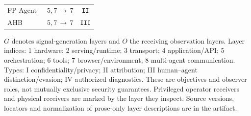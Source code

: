 \begin{table}[!t]
\begin{minipage}[t]{0.49\textwidth}
\begin{tabularx}{\linewidth}{@{}Ycc@{}}
FP-Agent~\cite{wang2026fpagent} & $5,7\,\to\,7$ & \texttt{II}\\
AHB~\cite{zhu2026turing} & $5,7\,\to\,7$ & \texttt{III}\\
\bottomrule\end{tabularx}\end{minipage}
\par\smallskip\raggedright $G$ denotes signal-generation layers and $O$ the receiving observation layers. Layer indices: 1 hardware; 2 serving/runtime; 3 transport; 4 application/API; 5 orchestration; 6 tools; 7 browser/environment; 8 multi-agent communication. Types: I confidentiality/privacy; II attribution; III human--agent distinction/evasion; IV authorized diagnostics. These are objectives and observer roles, not mutually exclusive security guarantees. Privileged operator receivers and physical receivers are marked by the layer they inspect. Source versions, locators and normalization of prose-only layer descriptions are in the artifact.
\end{table}
